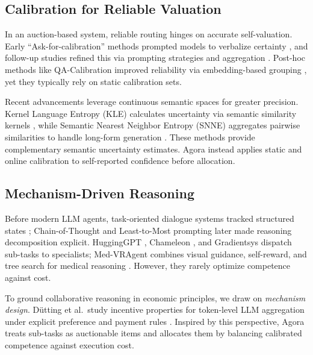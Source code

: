 \documentclass[11pt]{article}
\begin{document}
\subsection{Calibration for Reliable Valuation}
In an auction-based system, reliable routing hinges on accurate self-valuation. 
Early ``Ask-for-calibration'' methods prompted models to verbalize certainty \citep{tian2023justaskcalibrationstrategies}, and follow-up studies refined this via prompting strategies and aggregation \citep{xiong2024llmsexpressuncertaintyempirical,yang2024verbalizedconfidencescoresllms}. 
Post-hoc methods like QA-Calibration improved reliability via embedding-based grouping \citep{manggala2025qacalibrationlanguagemodelconfidence}, yet they typically rely on static calibration sets.

Recent advancements leverage continuous semantic spaces for greater precision. Kernel Language Entropy (KLE) calculates uncertainty via semantic similarity kernels \citep{nikitin2024kernellanguageentropyfinegrained}, while Semantic Nearest Neighbor Entropy (SNNE) aggregates pairwise similarities to handle long-form generation \citep{nguyen2025semanticentropyboostingllm}.
These methods provide complementary semantic uncertainty estimates. Agora instead applies static and online calibration to self-reported confidence before allocation.

\subsection{Mechanism-Driven Reasoning}
Before modern LLM agents, task-oriented dialogue systems tracked structured states \citep{feng-etal-2021-sequence}; Chain-of-Thought \citep{wei2023chain} and Least-to-Most prompting \citep{zhou2023leasttomostpromptingenablescomplex} later made reasoning decomposition explicit.
HuggingGPT \citep{shen2023hugginggptsolvingaitasks}, Chameleon \citep{lu2023chameleonplugandplaycompositionalreasoning}, and Gradientsys \citep{song2025gradientsysmultiagentllmscheduler} dispatch sub-tasks to specialists; Med-VRAgent combines visual guidance, self-reward, and tree search for medical reasoning \citep{guo-etal-2025-med}.
However, they rarely optimize competence against cost.

To ground collaborative reasoning in economic principles, we draw on \emph{mechanism design}.
D{\"u}tting et al.\ study incentive properties for token-level LLM aggregation under explicit preference and payment rules \citep{duetting2024mechanismdesignlargelanguage}.
Inspired by this perspective, Agora treats sub-tasks as auctionable items and allocates them by balancing calibrated competence against execution cost.
\end{document}

